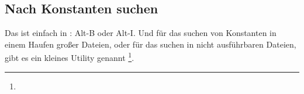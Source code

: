 \subsection{Nach Konstanten suchen}

Das ist einfach in \IDA: Alt-B oder Alt-I.
Und für das suchen von Konstanten in einem Haufen großer Dateien, oder für das suchen in nicht ausführbaren Dateien,
gibt es ein kleines Utility genannt \footnote{\BGREPURL}.



